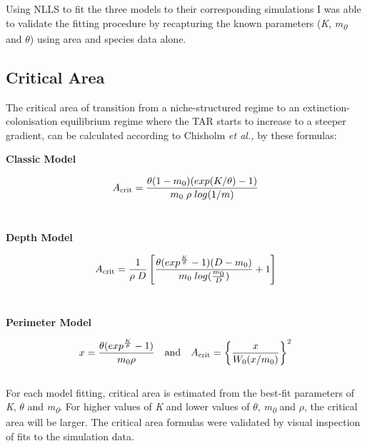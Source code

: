 \noindent Using NLLS to fit the three models to their corresponding simulations I was able to validate the fitting procedure by recapturing the known parameters (\textit{K}, \textit{m\textsubscript{0}} and $\theta$) using area and species data alone.


\subsection{Critical Area}


\noindent The critical area of transition from a niche-structured regime to an extinction-colonisation equilibrium regime where the TAR starts to increase to a steeper gradient, can be calculated according to Chisholm \textit{et al.,} by these formulas:

\begin{center}
\textbf{Classic Model}
\end{center}

\begin{equation}
A\textsubscript{crit}=\frac{\theta(1-m\textsubscript{0})(exp(K/\theta)-1)}{m\textsubscript{0}\;\rho\;log(1/m)} 
\end{equation}\\

\begin{center}
\textbf{Depth Model}
\end{center}

\begin{equation}
A\textsubscript{crit}=\frac{1}{\rho\; D}\left[\frac{{\theta}(exp^\frac{K}{\theta}-1)(D - m\textsubscript{0})}{m\textsubscript{0}\;log(\frac{m\textsubscript{0}}{D})}+1\right]
\end{equation}\\

\begin{center}
\textbf{Perimeter Model}
\end{center}

\begin{equation}
x = \frac{\theta(exp^\frac{K}{\theta}-1)}{m\textsubscript{0}{\rho}}
 \quad\mathrm{and}\quad
A\textsubscript{crit}=\left\{\frac{x}{W_{0}(x/m\textsubscript{0})}\right\}^2
\end{equation}\\

\noindent For each model fitting,  critical area is estimated from the best-fit parameters of \textit{K}, $\theta$ and \textit{m\textsubscript{0}}. For higher values of \textit{K} and lower values of $\theta$, \textit{m\textsubscript{0}} and $\rho$, the critical area will be larger.  The critical area formulas were validated by visual inspection of fits to the simulation data. \\

